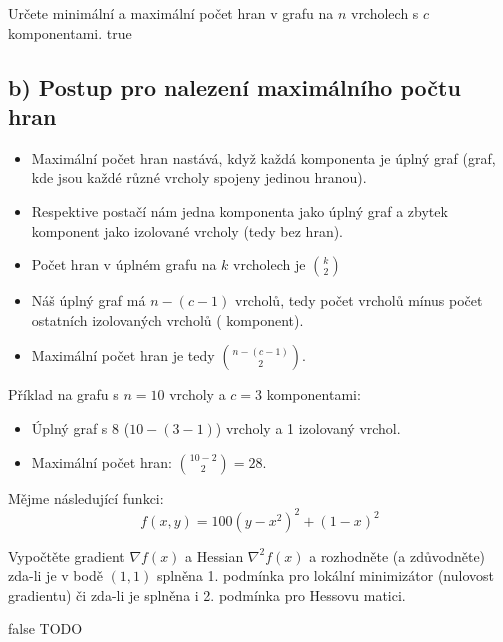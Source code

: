 \documentclass[10pt, a4paper]{ReportSheet}
\begin{document}
\begin{uloha}{3}{2}{
        Určete minimální a maximální počet hran v grafu na $n$ vrcholech s $c$ komponentami.
    }{true}
        \subsection{b) Postup pro nalezení maximálního počtu hran}
        \label{subsec:ukol-2-3b-maximalni-pocet-hran}
        \begin{itemize}
            \item Maximální počet hran nastává, když každá komponenta je úplný graf (graf, kde jsou každé různé vrcholy spojeny jedinou hranou).
            \item Respektive postačí nám jedna komponenta jako úplný graf a zbytek komponent jako izolované vrcholy (tedy
            bez hran).
            \item Počet hran v úplném grafu na $k$ vrcholech je $\binom{k}{2}$
            \item Náš úplný graf má $n-(c-1)$ vrcholů, tedy počet vrcholů mínus počet ostatních izolovaných vrcholů (
            komponent).
            \item Maximální počet hran je tedy $\binom{n-(c-1)}{2}$.
        \end{itemize}

        Příklad na grafu s $n=10$ vrcholy a $c=3$ komponentami:
        \begin{itemize}
            \item Úplný graf s 8 ($10-(3-1)$) vrcholy a 1 izolovaný vrchol.
            \item Maximální počet hran: $\binom{10-2}{2} = 28$.
        \end{itemize}

    \end{uloha}

    \begin{uloha}{4}{2}{
        Mějme následující funkci:
        \begin{equation*}
            f(x, y) = 100(y - x^2)^2 + (1 - x)^2
        \end{equation*}

        Vypočtěte gradient $\nabla f(x)$ a Hessian $\nabla^2 f(x)$ a rozhodněte (a zdůvodněte)
        zda-li je v bodě $(1, 1)$ splněna 1. podmínka pro lokální minimizátor (nulovost gradientu) či zda-li je splněna i 2. podmínka pro Hessovu matici.
    }{false}
        TODO
    \end{uloha}
\end{document}
